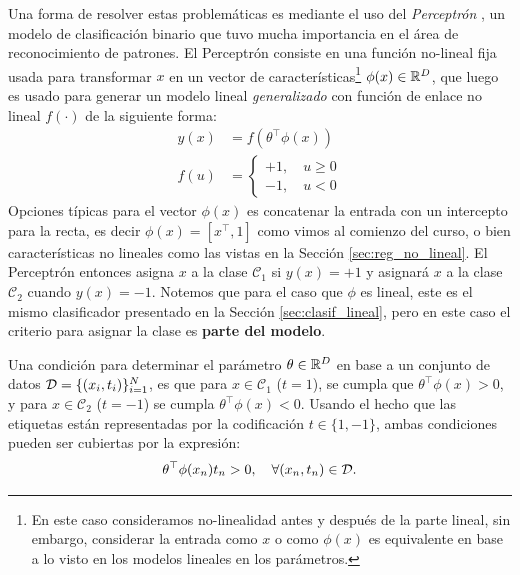 Una forma de resolver estas problemáticas es mediante el uso del \emph{Perceptrón} \cite{rosenblatt_1958}, un modelo de clasificación binario que tuvo mucha importancia en el área de reconocimiento de patrones. El Perceptrón consiste en una función no-lineal fija usada para transformar $x$ en un vector de características\footnote{En este caso consideramos no-linealidad antes y después de la parte lineal, sin embargo, considerar la entrada como $x$ o  como $\phi(x)$ es  equivalente en base a lo  visto en los modelos lineales en los parámetros. } $\phi(x)\in{\mathbb R}^D$, que luego es usado para generar un modelo lineal \emph{generalizado} con función de enlace no lineal $f(\cdot)$ de la siguiente forma:
\begin{align}
	y(x) &= f(\theta^\top\phi(x))\\
	f(u) &= \left\{\begin{matrix}
	+1,\quad u\geq 0\\
	-1,\quad u<0
	\end{matrix}\right.
\end{align}
Opciones típicas para el vector $\phi(x)$ es concatenar la entrada con un intercepto para la recta, es decir $\phi(x) = [x^\top, 1]$ como vimos al comienzo del curso, o bien características no lineales como las vistas en la Sección \ref{sec:reg_no_lineal}. El Perceptrón entonces asigna $x$ a la clase $\mathcal{C}_1$ si $y(x)=+1$ y asignará $x$ a la clase $\mathcal{C}_2$ cuando $y(x)=-1$. Notemos que  para  el caso que $\phi$ es lineal, este es el mismo clasificador presentado en la Sección \ref{sec:clasif_lineal}, pero en este caso el criterio para asignar la clase es \textbf{parte del modelo}.

Una condición para determinar el parámetro $\theta\in{\mathbb R}^D$ en base a un conjunto de datos  ${\mathcal D} = \{(x_i,t_i)\}_{i=1}^N$, es que para $x\in\mathcal{C}_1$ ($t=1$), se cumpla que $\theta^\top\phi(x) > 0$, y para $x\in\mathcal{C}_2$ ($t=-1$) se cumpla $\theta^\top \phi(x) < 0$. Usando el hecho que las etiquetas están representadas por la  codificación $t\in\{1,-1\}$, ambas condiciones pueden ser cubiertas por la expresión:
\begin{equation}
	\theta^\top\phi(x_n)t_n > 0,\quad \forall (x_n,t_n) \in {\mathcal D}.
\end{equation}

